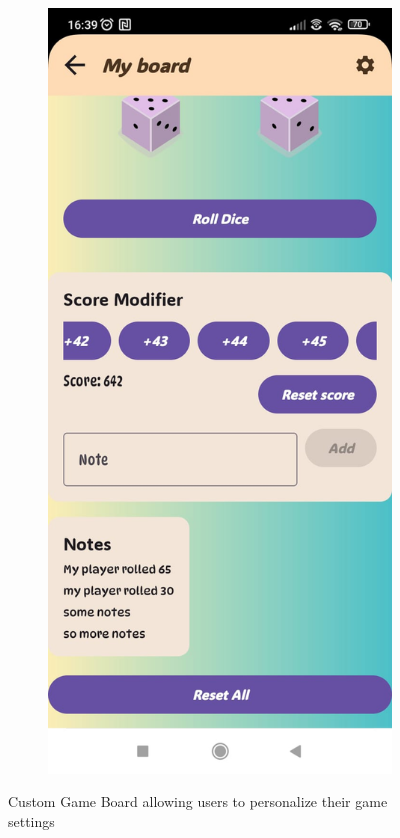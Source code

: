 \begin{figure}[ht!]
\begin{subfigure}[b]{0.26\textwidth}
    \end{subfigure} 
    \hspace{.5em}
    \begin{subfigure}[b]{0.26\textwidth}
        \includegraphics[width=\textwidth]{img/custom game.jpg}
    \end{subfigure}
    \caption{Custom Game Board allowing users to personalize their game settings}
    \label{fig:custom_game_board}
\end{figure}

